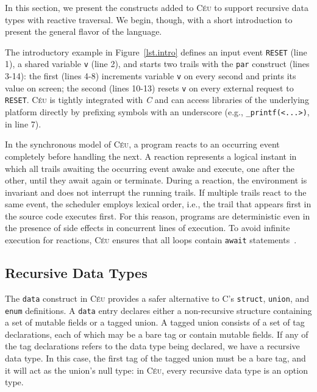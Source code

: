 \documentclass{sig-alternate}
\newcommand{\CEU}{\textsc{C\'{e}u}\xspace}
\newcommand{\code}[1] {{\small{\texttt{#1}}}}
\begin{document}
In this section, we present the constructs added to \CEU to support recursive
data types with reactive traversal. We begin, though, with a short
introduction to present the general flavor of the language.

The introductory example in Figure~\ref{lst.intro} defines an input event 
\code{RESET} (line 1), a shared variable \code{v} (line 2), and starts two 
trails with the \code{par} construct (lines 3-14): the first (lines 4-8) 
increments variable \code{v} on every second and prints its value on screen; 
the second (lines 10-13) resets \code{v} on every external request to 
\code{RESET}.
\CEU is tightly integrated with \emph{C} and can access libraries of the 
underlying platform directly by prefixing symbols with an underscore (e.g., 
\code{\_printf(<...>)}, in line 7).

In the synchronous model of \CEU, a program reacts to an occurring event 
completely before handling the next.
%
A reaction represents a logical instant in which all trails awaiting the 
occurring event awake and execute, one after the other, until they await again 
or terminate.
%
During a reaction, the environment is invariant and does not interrupt the 
running trails.
If multiple trails react to the same event, the scheduler employs lexical 
order, i.e., the trail that appears first in the source code executes first.
%
For this reason, programs are deterministic even in the presence of side 
effects in concurrent lines of execution.
%
To avoid infinite execution for reactions, \CEU ensures that all loops contain 
\code{await} statements~\cite{ceu.sensys13}.

\subsection{Recursive Data Types}

The \code{data} construct in \CEU provides a safer alternative to C's
\code{struct}, \code{union}, and \code{enum} definitions. A \code{data} entry
declares either a non-recursive structure containing a set of mutable fields
or a tagged union. A tagged union consists of a set of tag declarations, each
of which may be a bare tag or contain mutable fields. If any of the tag
declarations refers to the data type being declared, we have a recursive data
type. In this case, the first tag of the tagged union must be a bare tag, and
it will act as the union's null type: in \CEU, every recursive data type
is an option type.

%
%
%
%
%
\end{document}
